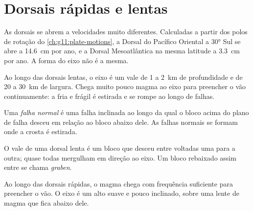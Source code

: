 \section{Dorsais rápidas e lentas}

As dorsais se abrem a velocidades muito diferentes. Calculadas a partir dos
polos de rotação do \cref{ch:g11:plate-motions}, a Dorsal do Pacífico
Oriental a \ang{30} Sul se abre a \qty{14.6}{cm} por ano, e a Dorsal
Mesoatlântica na mesma latitude a \qty{3.3}{cm} por ano. A forma do eixo não
é a mesma.

Ao longo das dorsais lentas, o eixo é um vale de 1 a \qty{2}{km} de
profundidade e de 20 a \qty{30}{km} de largura. Chega muito pouco magma ao
eixo para preencher o vão continuamente: a  fria e frágil é
estirada e se rompe ao longo de falhas.

\begin{definition}\label{def:g11:ocean-ridges:normal-fault}
Uma \emph{falha normal} é uma falha inclinada ao longo
da qual o bloco acima do plano de falha desceu em relação ao bloco abaixo
dele. As falhas normais se formam onde a crosta é estirada.
\end{definition}

O vale de uma dorsal lenta é um bloco que desceu entre 
voltadas uma para a outra; quase todas mergulham em direção ao eixo. Um
bloco rebaixado assim entre  se chama \emph{graben}.

Ao longo das dorsais rápidas, o magma chega com frequência suficiente para
preencher o vão. O eixo é um alto suave e pouco inclinado, sobre uma lente
de magma que fica abaixo dele.

